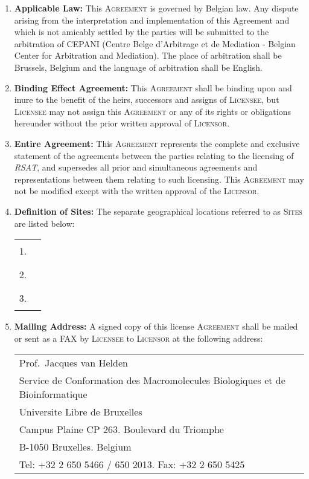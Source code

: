 \documentclass[12pt]{article}
\newcommand{\RSAT}[0]{\emph{RSAT}\xspace}
\newcommand{\Licensor}[0]{\textsc{Licensor}\xspace}
\newcommand{\Licensee}[0]{\textsc{Licensee}\xspace}
\newcommand{\Agreement}[0]{\textsc{Agreement}\xspace}
\newcommand{\Sites}[0]{\textsc{Sites}\xspace}
\newcommand{\Fillline}[0]{\rule{10cm}{1pt}}
\newcommand{\Paragraph}[2]{\item \textbf{#1:} #2}
\begin{document}
\begin{enumerate}
\Paragraph{Applicable Law}{This \Agreement is governed by Belgian law. Any
dispute arising from the interpretation and implementation of this
Agreement and which is not amicably settled by the parties will be
submitted to the arbitration of CEPANI (Centre Belge d'Arbitrage et de
Mediation - Belgian Center for Arbitration and Mediation). The place
of arbitration shall be Brussels, Belgium and the language of
arbitration shall be English.

}

\Paragraph{Binding Effect Agreement}{This \Agreement shall be binding 
upon and inure to the benefit of the heirs, successors and assigns of 
\Licensee, but \Licensee may not assign this \Agreement or any of its 
rights or obligations hereunder without the prior written approval of 
\Licensor.
}

\Paragraph{Entire Agreement}{This \Agreement represents the complete 
and exclusive statement of the agreements between the parties 
relating to the licensing of \RSAT, and supersedes all 
prior and simultaneous agreements and representations between them 
relating to such licensing. This \Agreement may not be modified except 
with the written approval of the \Licensor.
}

\Paragraph{Definition of Sites}{
The separate geographical locations 
referred to as \Sites are listed below:

\begin{center}
\begin{tabular}{ll}
1.&\Fillline\\[5mm]
2.&\Fillline\\[5mm]
3.&\Fillline
\end{tabular}
\end{center}
}
\label{DefSites}

\Paragraph{Mailing Address}{A signed copy of this license \Agreement
shall be mailed or sent as a FAX by \Licensee to \Licensor at the 
following address:

\begin{tabular}{@{}l}
Prof.\ Jacques van Helden\\
Service de Conformation des Macromolecules Biologiques et de Bioinformatique \\
Universite Libre de Bruxelles\\
Campus Plaine CP 263. Boulevard du Triomphe\\
B-1050 Bruxelles. Belgium\\
Tel: +32 2 650 5466 / 650 2013. Fax: +32 2 650 5425\\
\end{tabular}

}
\end{enumerate}
\end{document}
